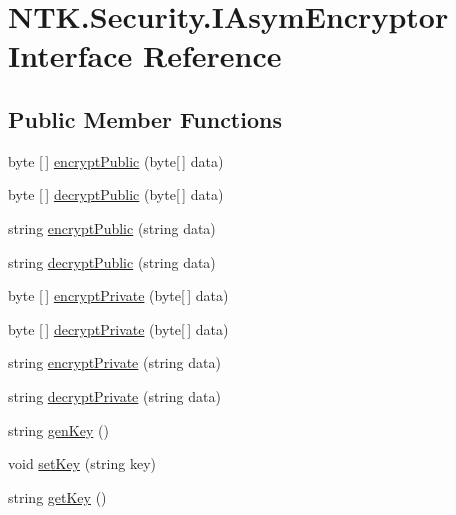 \hypertarget{interface_n_t_k_1_1_security_1_1_i_asym_encryptor}{}\section{N\+T\+K.\+Security.\+I\+Asym\+Encryptor Interface Reference}
\label{interface_n_t_k_1_1_security_1_1_i_asym_encryptor}


 


\subsection*{Public Member Functions}
\begin{DoxyCompactItemize}
\item 
byte \mbox{[}$\,$\mbox{]} \mbox{\hyperlink{interface_n_t_k_1_1_security_1_1_i_asym_encryptor_acbbe8a40bde117549ab7ff8bdc15dbd9}{encrypt\+Public}} (byte\mbox{[}$\,$\mbox{]} data)
\item 
byte \mbox{[}$\,$\mbox{]} \mbox{\hyperlink{interface_n_t_k_1_1_security_1_1_i_asym_encryptor_a4816a10a16999b7d109fd58c312a4657}{decrypt\+Public}} (byte\mbox{[}$\,$\mbox{]} data)
\item 
string \mbox{\hyperlink{interface_n_t_k_1_1_security_1_1_i_asym_encryptor_a0df0e0bf48b8df3425b5de820ef08ffa}{encrypt\+Public}} (string data)
\item 
string \mbox{\hyperlink{interface_n_t_k_1_1_security_1_1_i_asym_encryptor_aa34d16c0af4b5d2249eca96920061c32}{decrypt\+Public}} (string data)
\item 
byte \mbox{[}$\,$\mbox{]} \mbox{\hyperlink{interface_n_t_k_1_1_security_1_1_i_asym_encryptor_af0ffc13eb521efbaad8f87e90469fb28}{encrypt\+Private}} (byte\mbox{[}$\,$\mbox{]} data)
\item 
byte \mbox{[}$\,$\mbox{]} \mbox{\hyperlink{interface_n_t_k_1_1_security_1_1_i_asym_encryptor_a9a78aebff4cc46081891188c1058b125}{decrypt\+Private}} (byte\mbox{[}$\,$\mbox{]} data)
\item 
string \mbox{\hyperlink{interface_n_t_k_1_1_security_1_1_i_asym_encryptor_a35f7b4196ebc0601978db516da7a2e0b}{encrypt\+Private}} (string data)
\item 
string \mbox{\hyperlink{interface_n_t_k_1_1_security_1_1_i_asym_encryptor_a79aeecc1982b5a6fb6beb187533f3df8}{decrypt\+Private}} (string data)
\item 
string \mbox{\hyperlink{interface_n_t_k_1_1_security_1_1_i_asym_encryptor_a4f5b5b2395e826bb0df14b5b6a21cf77}{gen\+Key}} ()
\item 
void \mbox{\hyperlink{interface_n_t_k_1_1_security_1_1_i_asym_encryptor_a765bee2c4ab7ac45f3189a52e76ef65e}{set\+Key}} (string key)
\item 
string \mbox{\hyperlink{interface_n_t_k_1_1_security_1_1_i_asym_encryptor_a7be061a0f2ddaa7ad536b6da7d2d9a3e}{get\+Key}} ()
\end{DoxyCompactItemize}


